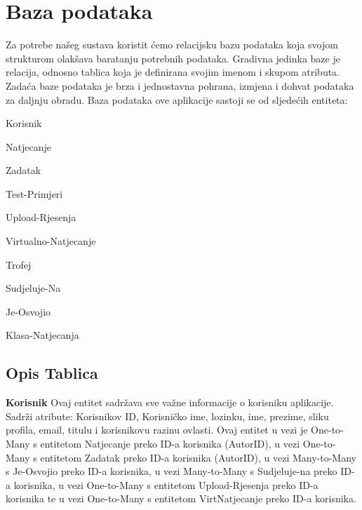 				
		\section{Baza podataka}
		
		
		
		\noindent Za potrebe našeg sustava koristit  ćemo relacijsku bazu podataka koja svojom strukturom olakšava baratanju potrebnih podataka. Gradivna jedinka baze je relacija, odnosno tablica koja je definirana svojim imenom i skupom atributa. Zadaća baze podataka je brza i jednostavna pohrana, izmjena i dohvat podataka za daljnju obradu.
		Baza podataka ove aplikacije sastoji se od sljedećih entiteta:
		\begin{packed_item}
			\item Korisnik
			\item Natjecanje
			\item Zadatak
			\item Test-Primjeri
			\item Upload-Rjesenja
			\item Virtualno-Natjecanje
			\item Trofej
			\item Sudjeluje-Na
			\item Je-Osvojio
			\item Klasa-Natjecanja
		\end{packed_item}
		\subsection{Opis Tablica}
		\noindent \textbf{Korisnik} \space \space Ovaj entitet sadržava sve važne informacije o korisniku aplikacije.
		Sadrži atribute: Korisnikov ID, Korisničko ime, lozinku, ime, prezime, sliku profila, email, titulu i korisnikovu razinu ovlasti. Ovaj entitet u vezi je
		One-to-Many s entitetom Natjecanje preko ID-a korisnika (AutorID), u vezi One-to-Many s entitetom Zadatak preko ID-a korisnika (AutorID), u vezi Many-to-Many s  Je-Osvojio preko ID-a korisnika, u vezi Many-to-Many s  Sudjeluje-na preko ID-a korisnika, u vezi One-to-Many s entitetom Upload-Rjesenja preko ID-a korisnika  te u vezi One-to-Many s entitetom VirtNatjecanje preko ID-a korisnika.
		
